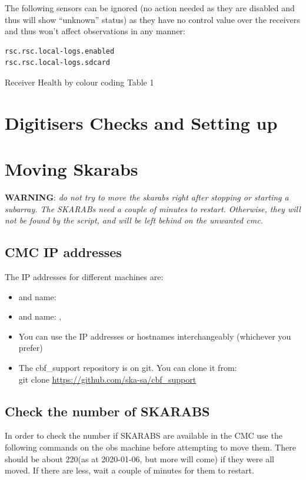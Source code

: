 The following sensors can be ignored (no action needed as they are disabled and thus will show “unknown” status) as they have no control value over the receivers and thus won’t affect observations in any manner:
\begin{lstlisting}[style=DOS]
rsc.rsc.local-logs.enabled
rsc.rsc.local-logs.sdcard
\end{lstlisting}


Receiver Health by colour coding
Table 1

\section{Digitisers Checks and Setting up }




\section{Moving Skarabs}


\textbf{WARNING}:\textit{ do not try to move the skarabs right after stopping or starting a subarray. The SKARABs need a couple of minutes to restart. Otherwise, they will not be found by the script, and will be left behind on the unwanted cmc.}\\

\subsection{CMC IP addresses}
The IP addresses for different machines are:
\begin{itemize}


	\item[]  and name: 
\item[]  and name: , 

\item[] You can use the IP addresses or hostnames interchangeably (whichever you prefer) 


\item[] The cbf\_support repository is on git. You can clone it from:\\
git clone \url{https://github.com/ska-sa/cbf_support}
\end{itemize}
\subsection{Check the number of SKARABS}
In order to check the number if SKARABS are available in the CMC use the following
commands on the obs machine before attempting to move them. There should be about 220(as at 2020-01-06, but more will come) if they were all moved. If there are less, wait a couple
of minutes for them to restart.

